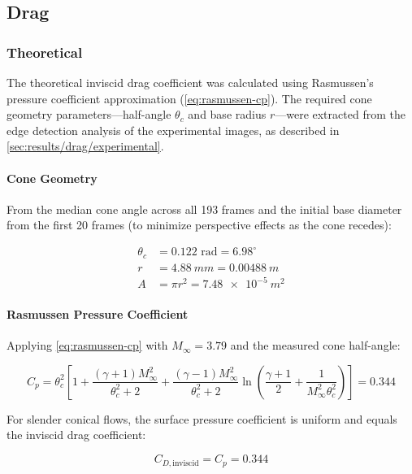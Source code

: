 \subsection{Drag} \label{sec:results/drag}

\subsubsection{Theoretical} \label{sec:results/drag/theoretical}

The theoretical inviscid drag coefficient was calculated using Rasmussen's pressure coefficient approximation (\ref{eq:rasmussen-cp}). The required cone geometry parameters---half-angle $\theta_c$ and base radius $r$---were extracted from the edge detection analysis of the experimental images, as described in \ref{sec:results/drag/experimental}.

\paragraph{Cone Geometry}

From the median cone angle across all \num{193} frames and the initial base diameter from the first 20 frames (to minimize perspective effects as the cone recedes):

\begin{align}
    \theta_c &= 0.122 \text{ rad} = 6.98^\circ \\
    r &= \qty{4.88}{mm} = \qty{0.00488}{m} \\
    A &= \pi r^2 = \qty{7.48e-5}{m^2}
\end{align}

\paragraph{Rasmussen Pressure Coefficient}

Applying \cref{eq:rasmussen-cp} with $M_\infty = 3.79$ and the measured cone half-angle:

\begin{equation}
    C_p = \theta_c^2 \left[1 + \frac{(\gamma + 1)M_\infty^2}{\theta_c^2 + 2} + \frac{(\gamma - 1)M_\infty^2}{\theta_c^2 + 2}\ln\left(\frac{\gamma + 1}{2} + \frac{1}{M_\infty^2\theta_c^2}\right)\right] = 0.344
\end{equation}

For slender conical flows, the surface pressure coefficient is uniform and equals the inviscid drag coefficient:

\begin{equation}
    C_{D,\text{inviscid}} = C_p = 0.344
\end{equation}


